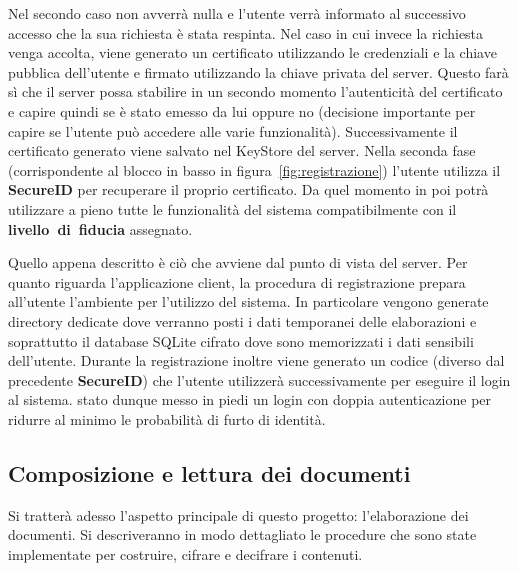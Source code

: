 Nel secondo caso non avverrà nulla e l'utente verrà informato al successivo accesso che la sua richiesta è stata respinta. Nel caso in cui invece la richiesta venga accolta, viene generato un certificato utilizzando le credenziali e la chiave pubblica dell'utente e firmato utilizzando la chiave privata del server. Questo farà sì che il server possa stabilire in un secondo momento l'autenticità del certificato e capire quindi se è stato emesso da lui oppure no (decisione importante per capire se l'utente può accedere alle varie funzionalità). Successivamente il certificato generato viene salvato nel KeyStore del server.
Nella seconda fase (corrispondente al blocco in basso in figura~\ref{fig:registrazione}) l'utente utilizza il \textbf{SecureID} per recuperare il proprio certificato. Da quel momento in poi potrà utilizzare a pieno tutte le funzionalità del sistema compatibilmente con il \textbf{livello~di~fiducia} assegnato.

Quello appena descritto è ciò che avviene dal punto di vista del server. Per quanto riguarda l'applicazione client, la procedura di registrazione prepara all'utente l'ambiente per l'utilizzo del sistema. In particolare vengono generate directory dedicate dove verranno posti i dati temporanei delle elaborazioni e soprattutto il database SQLite cifrato dove sono memorizzati i dati sensibili dell'utente. Durante la registrazione inoltre viene generato un codice (diverso dal precedente \textbf{SecureID}) che l'utente utilizzerà successivamente per eseguire il login al sistema.  stato dunque messo in piedi un login con doppia autenticazione per ridurre al minimo le probabilità di furto di identità.
	
\subsection{Composizione e lettura dei documenti}
	\label{subsec:documenti}
Si tratterà adesso l'aspetto principale di questo progetto: l'elaborazione dei documenti. Si descriveranno in modo dettagliato le procedure che sono state implementate per costruire, cifrare e decifrare i contenuti.


